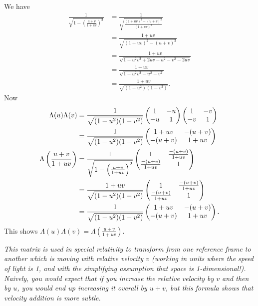 \documentclass{article}
\begin{document}
\begin{Solution}\label{sol:exr:lorentz}
We have
\begin{align*}
\frac{1}{\sqrt{1-\left(\frac{u+v}{1+uv}\right)^2}}&=\frac{1}{\sqrt{\frac{(1+uv)^2-(u+v)^2}{(1+uv)^2}}}\\
&=\frac{1+uv}{\sqrt{(1+uv)^2-(u+v)^2}}\\
&=\frac{1+uv}{\sqrt{1+u^2v^2+2uv-u^2-v^2-2uv}}\\
&=\frac{1+uv}{\sqrt{1+u^2v^2-u^2-v^2}}\\
&=\frac{1+uv}{\sqrt{(1-u^2)(1-v^2)}}.
\end{align*}
Now
\begin{align*}
\Lambda(u)\Lambda(v)&=\frac{1}{\sqrt{(1-u^2)(1-v^2)}}\begin{pmatrix} 1 & -u \\ -u & 1 \end{pmatrix}\begin{pmatrix} 1 & -v \\ -v & 1\end{pmatrix}\\
&=\frac{1}{\sqrt{(1-u^2)(1-v^2)}}\begin{pmatrix} 1+uv & -(u+v) \\ -(u+v) & 1+uv\end{pmatrix}\\
\Lambda\left(\frac{u+v}{1+uv}\right)&=\frac{1}{\sqrt{1-\left(\frac{u+v}{1+uv}\right)^2}}\begin{pmatrix} 1 & \frac{-(u+v)}{1+uv} \\ \frac{-(u+v)}{1+uv} & 1 \end{pmatrix}\\
&=\frac{1+uv}{\sqrt{(1-u^2)(1-v^2)}}\begin{pmatrix} 1 & \frac{-(u+v)}{1+uv} \\ \frac{-(u+v)}{1+uv} & 1 \end{pmatrix}\\
&=\frac{1}{\sqrt{(1-u^2)(1-v^2)}}\begin{pmatrix} 1+uv & -(u+v) \\ -(u+v) & 1+uv \end{pmatrix}.
\end{align*}
This shows
\(\Lambda(u)\Lambda(v)=\Lambda\left(\frac{u+v}{1+uv}\right)\).


{\em This matrix is used in special relativity to transform from one
reference frame to another which is moving with relative velocity
\(v\) (working in units where the speed of light is 1, and with the
simplifying assumption that space is 1-dimensional!). Naively, you
would expect that if you increase the relative velocity by \(v\) and
then by \(u\), you would end up increasing it overall by \(u+v\),
but this formula shows that velocity addition is more subtle.}


\end{Solution}


\setcounter{section}{3}
\end{document}

